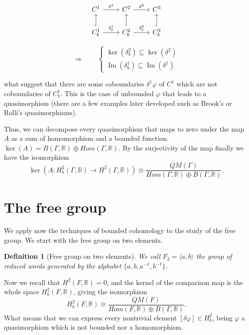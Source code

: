 \documentclass[leqno]{article}
\DeclareMathOperator{\im}{Im}
\newtheorem*{definition}{Definition}
\begin{document}
\begin{minipage}{0.5\textwidth}
\[\begin{tikzcd}
	{C^1} & {C^2} & {C^3} \\
	{C^1_b} & {C^2_b} & {C^3_b}
	\arrow["{\delta^1}", from=1-1, to=1-2]
	\arrow["{\delta^2}", from=1-2, to=1-3]
	\arrow["{\delta^1_b}", from=2-1, to=2-2]
	\arrow["{\delta^2_b}", from=2-2, to=2-3]
	\arrow[hook, from=2-2, to=1-2]
	\arrow[hook, from=2-1, to=1-1]
	\arrow[hook, from=2-3, to=1-3]
\end{tikzcd}\]
\end{minipage}
\begin{minipage}{0.5\textwidth}
\[
  \Rightarrow \qquad
\begin{cases}
  \ker(\delta^2_b) \subseteq  \ker(\delta^2) \\
  \im(\delta^1_b) \subseteq \im(\delta^1)
\end{cases}
\] 
\end{minipage}

what suggest that there are some coboundaries $\delta^1 \varphi $ of $C^1$ which are not coboundaries of $C^1_b$. This is the case of unbounded $\varphi$ that leads to a quasimorphism (there are a few examples later developed such as Brook's or Rolli's quasimorphisms).

Thus, we can decompose every quasimorphism that maps to zero under the map $A$ as a sum of homomorphism and a bounded function.  $\ker(A) = B(\Gamma, \mathbb{R})\oplus Hom(\Gamma , \mathbb{R})$. By the surjectivity of the map finally we have the isomorphism
\[
\ker(A: H_b^2(\Gamma , \mathbb{R})\to H^2(\Gamma, \mathbb{R})) \cong \frac{QM(\Gamma )}{Hom(\Gamma , \mathbb{R})\oplus B(\Gamma , \mathbb{R})}.
\] 

\section{The free group}
We apply now the techniques of bounded cohomology to the study of the free group. We start with the free group on two elements.

\begin{definition}[Free group on two elements] We call $F_2 = \langle a, b \rangle  $ the group of reduced words generated by the alphabet $\{a, b, a^{-1}, b^{-1}\}$.
\end{definition}

Now we recall that $H^2(F, \mathbb{R}) = 0$, and the kernel of the comparison map is the whole space $H^2_b(F, \mathbb{R})$, giving the isomorphism
\[
H^2_b(F, \mathbb{R}) \cong \frac{QM(F)}{Hom(F, \mathbb{R})\oplus B(\Gamma , \mathbb{R})}.
\] 
What means that we can express every nontrivial element $[\delta \varphi ]\in H^2_b$, being $\varphi $ a quasimorphism which is not bounded nor a homomorphism.
\end{document}
